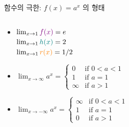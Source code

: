 \documentclass[aspectratio=169]{beamer}
\begin{document}
\begin{frame}{함수의 극한: $f(x) = a^x$ 의 형태}
\begin{columns}
    \begin{column}{0.45\textwidth}
      \begin{itemize}
        \item $\lim_{x \to 1} \textcolor{violet}{f(x)} = e $ \\
          $\lim_{x \to 1} \textcolor{teal}{h(x)} = 2 $ \\
          $\lim_{x \to 1} \textcolor{orange}{r(x)} = 1/2 $
        \item $\lim_{x \to \infty} a^x = 
          \begin{cases}
            0 & \text{if } 0 < a < 1 \\
            1 & \text{if } a = 1 \\
            \infty & \text{if } a > 1
          \end{cases}$
        \item $\lim_{x \to -\infty} a^x = 
          \begin{cases}
            \infty & \text{if } 0 < a < 1 \\
            1 & \text{if } a = 1 \\
            0 & \text{if } a > 1
          \end{cases}$
      \end{itemize}
    \end{column}
  \end{columns}
\end{frame}
\end{document}
